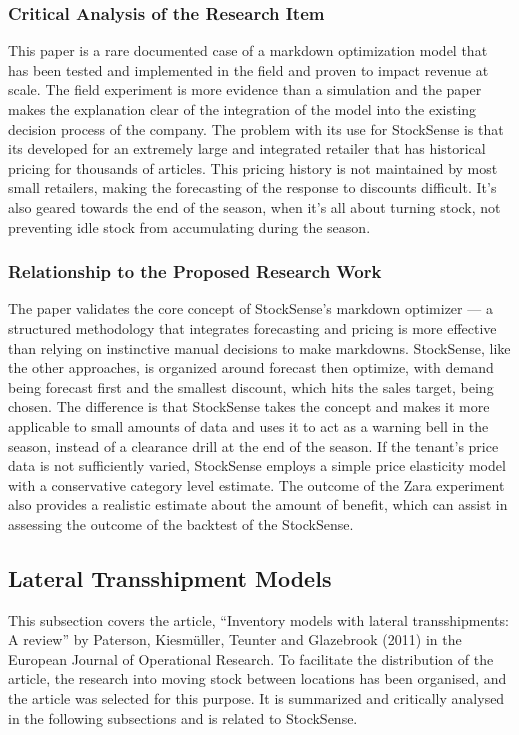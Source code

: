 \documentclass{StockSense}
\begin{document}
\subsubsection{Critical Analysis of the Research Item}

This paper is a rare documented case of a markdown optimization model that has been tested and implemented in the field and proven to impact revenue at scale. The field experiment is more evidence than a simulation and the paper makes the explanation clear of the integration of the model into the existing decision process of the company. The problem with its use for StockSense is that its developed for an extremely large and integrated retailer that has historical pricing for thousands of articles. This pricing history is not maintained by most small retailers, making the forecasting of the response to discounts difficult. It's also geared towards the end of the season, when it's all about turning stock, not preventing idle stock from accumulating during the season.

\subsubsection{Relationship to the Proposed Research Work}

The paper validates the core concept of StockSense's markdown optimizer --- a structured methodology that integrates forecasting and pricing is more effective than relying on instinctive manual decisions to make markdowns. StockSense, like the other approaches, is organized around forecast then optimize, with demand being forecast first and the smallest discount, which hits the sales target, being chosen. The difference is that StockSense takes the concept and makes it more applicable to small amounts of data and uses it to act as a warning bell in the season, instead of a clearance drill at the end of the season. If the tenant's price data is not sufficiently varied, StockSense employs a simple price elasticity model with a conservative category level estimate. The outcome of the Zara experiment also provides a realistic estimate about the amount of benefit, which can assist in assessing the outcome of the backtest of the StockSense.

\subsection{Lateral Transshipment Models}

This subsection covers the article, ``Inventory models with lateral transshipments: A review'' by Paterson, Kiesm\"uller, Teunter and Glazebrook (2011) in the European Journal of Operational Research. To facilitate the distribution of the article, the research into moving stock between locations has been organised, and the article was selected for this purpose. It is summarized and critically analysed in the following subsections and is related to StockSense.
\end{document}
